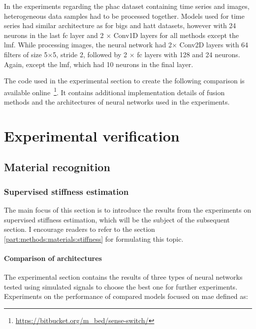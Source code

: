 \documentclass[a4paper, 10pt, twoside]{report}
\begin{document}
In the experiments regarding the \acrshort{phac} dataset containing time series and images, heterogeneous data samples had to be processed together. Models used for time series had similar architecture as for \acrshort{bigs} and \acrshort{hatt} datasets, however with 24 neurons in the last \acrshort{fc} layer and 2 $\times$ Conv1D layers for all methods except the \acrshort{lmf}. While processing images, the neural network had 2$\times$ Conv2D layers with 64 filters of size 5$\times$5, stride 2, followed by 2 $\times$ \acrshort{fc} layers with 128 and 24 neurons. Again, except the \acrshort{lmf}, which had 10 neurons in the final layer.

The code used in the experimental section to create the following comparison is available online~\footnote{\url{https://bitbucket.org/m_bed/sense-switch/}}. It contains additional implementation details of fusion methods and the architectures of neural networks used in the experiments.

\part{Experimental verification}
\label{part:experiments}

\chapter{Material recognition}
\label{part:experiments:materials}

\section{Supervised stiffness estimation}
\label{part:experiments:materials:stiffness}

The main focus of this section is to introduce the results from the experiments on supervised stiffness estimation, which will be the subject of the subsequent section. I encourage readers to refer to the section \ref{part:methods:materials:stiffness} for formulating this topic.

\subsection{Comparison of architectures}
\label{part:experiments:materials:stiffness:comparison}

The experimental section contains the results of three types of neural networks tested using simulated signals to choose the best one for further experiments. Experiments on the performance of compared models focused on \acrfull{mae} defined as:
\end{document}
